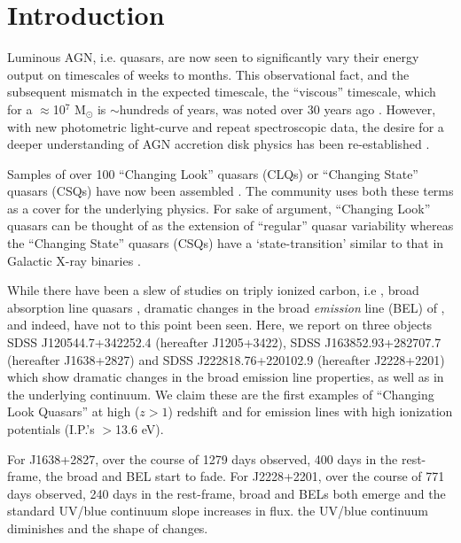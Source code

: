 \documentclass[a4paper,fleqn,usenatbib]{mnras}
\begin{document}
\section{Introduction}
Luminous AGN, i.e. quasars, are now seen to significantly vary their energy output on timescales of weeks to months. 
This observational fact, and the subsequent mismatch in the expected timescale, the ``viscous'' timescale, 
which for a $\approx$10$^{7}$ M$_{\odot}$ is $\sim$hundreds of years, was noted over 30 years ago \citep[e.g.][]{Alloin1985}. 
However, with new photometric light-curve and repeat spectroscopic data, the desire for a deeper understanding 
of AGN accretion disk physics  has been re-established \citep[e.g.][]{Lawrence2018, Antonucci2018}. 

Samples of over 100 ``Changing Look'' quasars (CLQs) or ``Changing State'' quasars (CSQs) have now been 
assembled \citep[e.g.][]{MacLeod2019, Graham2019}. The community uses both these
terms as a cover for the underlying physics. For sake of argument, ``Changing Look'' quasars can be 
thought of as the extension of ``regular'' quasar variability \citep[e.g.][]{MacLeod2012} whereas 
the ``Changing State'' quasars (CSQs) have a `state-transition' similar to that in Galactic X-ray binaries
\citep[e.g][]{NodaDone2018, Ruan2019}. 

While there have been a slew of studies on triply ionized carbon, i.e \civ, broad absorption line quasars
\citep[BAL QSOs; see e.g. Table 1][]{Hemler2019}, dramatic changes in the 
broad {\it emission} line (BEL) of \civ, and indeed, \ciii have not to this point been seen. 
Here, we report on three objects 
SDSS J120544.7+342252.4  (hereafter J1205+3422), 
SDSS J163852.93+282707.7 (hereafter J1638+2827) and
SDSS J222818.76+220102.9 (hereafter J2228+2201)  
which show dramatic changes in the \civ broad emission line
properties, as well as in the underlying continuum. We claim these are
the first examples of ``Changing Look Quasars'' at high ($z>1$)
redshift and for emission lines with high ionization potentials
(I.P.'s $>$13.6 eV).

For J1638+2827, over the course of 1279 days observed, 400 days in the rest-frame, the  broad \civ and \ciii BEL start to fade.  
For J2228+2201, over the course of 771 days observed, 240 days in the rest-frame, broad \civ and \ciii BELs both emerge and the 
standard UV/blue continuum slope increases in flux. 
the UV/blue continuum diminishes and the shape of \lya changes. 
\end{document}
